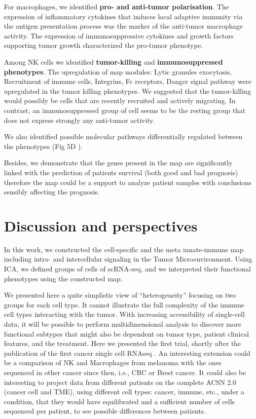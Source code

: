 \documentclass[12pt,]{book}
\theoremstyle{definition}
\theoremstyle{definition}
\theoremstyle{definition}
\theoremstyle{remark}
\begin{document}
For macrophages, we identified \textbf{pro- and anti-tumor
polarisation}. The expression of inflammatory cytokines that induces
local adaptive immunity via the antigen presentation process was the
marker of the anti-tumor macrophage activity. The expression of
immunosuppressive cytokines and growth factors supporting tumor growth
characterized the pro-tumor phenotype.

Among NK cells we identified \textbf{tumor-killing} and
\textbf{immunosuppressed phenotypes}. The upregulation of map modules:
Lytic granules exocytosis, Recruitment of immune cells, Integrins, Fc
receptors, Danger signal pathway were upregulated in the tumor killing
phenotypes. We suggested that the tumor-killing would possibly be cells
that are recently recruited and actively migrating. In contrast, an
immunosuppressed group of cell seems to be the resting group that does
not express strongly any anti-tumor activity.

We also identified possible molecular pathways differentially regulated
between the phenotypes (Fig 5D \citet{Kondratova2018}).

Besides, we demonstrate that the genes present in the map are
significantly linked with the prediction of patients survival (both good
and bad prognosis) therefore the map could be a support to analyze
patient samples with conclusions sensibly affecting the prognosis.

\hypertarget{discussion-and-perspectives}{%
\section{Discussion and
perspectives}\label{discussion-and-perspectives}}

In this work, we constructed the cell-specific and the meta
innate-immune map including intra- and intercellular signaling in the
Tumor Microenvironment. Using ICA, we defined groups of cells of
scRNA-seq, and we interpreted their functional phenotypes using the
constructed map.

We presented here a quite simplistic view of ``heterogeneity'' focusing
on two groups for each cell type. It cannot illustrate the full
complexity of the immune cell types interacting with the tumor. With
increasing accessibility of single-cell data, it will be possible to
perform multidimensional analysis to discover more functional subtypes
that might also be dependent on tumor type, patient clinical features,
and the treatment. Here we presented the first trial, shortly after the
publication of the first cancer single cell RNAseq \citep{Tirosh2016}.
An interesting extension could be a comparison of NK and Macrophages
from melanoma with the ones sequenced in other cancer since then, i.e.,
CRC or Brest cancer. It could also be interesting to project data from
different patients on the complete ACSN 2.0 (cancer cell and TME), using
different cell types: cancer, immune, etc., under a condition, that they
would have equilibrated and a sufficient number of cells sequenced per
patient, to see possible differences between patients.
\end{document}
